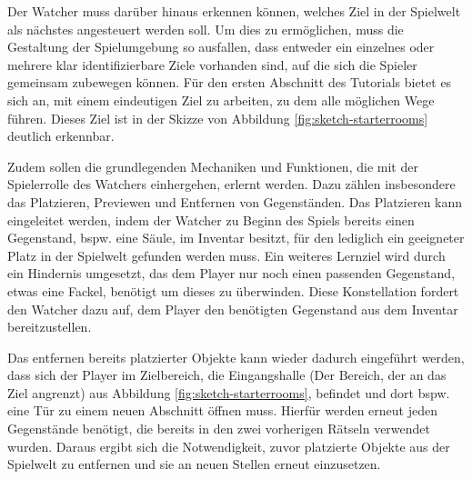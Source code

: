 
Der Watcher muss darüber hinaus erkennen können, welches Ziel in der Spielwelt als nächstes angesteuert werden soll. Um dies zu ermöglichen, muss die Gestaltung der Spielumgebung so ausfallen, dass entweder ein einzelnes oder mehrere klar identifizierbare Ziele vorhanden sind, auf die sich die Spieler gemeinsam zubewegen können. Für den ersten Abschnitt des Tutorials bietet es sich an, mit einem eindeutigen Ziel zu arbeiten, zu dem alle möglichen Wege führen. Dieses Ziel ist in der Skizze von Abbildung \ref{fig:sketch-starterrooms} deutlich erkennbar.

Zudem sollen die grundlegenden Mechaniken und Funktionen, die mit der Spielerrolle des Watchers einhergehen, erlernt werden. Dazu zählen insbesondere das Platzieren, Previewen und Entfernen von Gegenständen. Das Platzieren kann eingeleitet werden, indem der Watcher zu Beginn des Spiels bereits einen Gegenstand, bspw. eine Säule, im Inventar besitzt, für den lediglich ein geeigneter Platz in der Spielwelt gefunden werden muss. Ein weiteres Lernziel wird durch ein Hindernis umgesetzt, das dem Player nur noch einen passenden Gegenstand, etwas eine Fackel, benötigt um dieses zu überwinden. Diese Konstellation fordert den Watcher dazu auf, dem Player den benötigten Gegenstand aus dem Inventar bereitzustellen.

Das entfernen bereits platzierter Objekte kann wieder dadurch eingeführt werden, dass sich der Player im Zielbereich, die Eingangshalle (Der Bereich, der an das Ziel angrenzt) aus Abbildung \ref{fig:sketch-starterrooms}, befindet und dort bspw. eine Tür zu einem neuen Abschnitt öffnen muss. Hierfür werden erneut jeden Gegenstände benötigt, die bereits in den zwei vorherigen Rätseln verwendet wurden. Daraus ergibt sich die Notwendigkeit, zuvor platzierte Objekte aus der Spielwelt zu entfernen und sie an neuen Stellen erneut einzusetzen.


